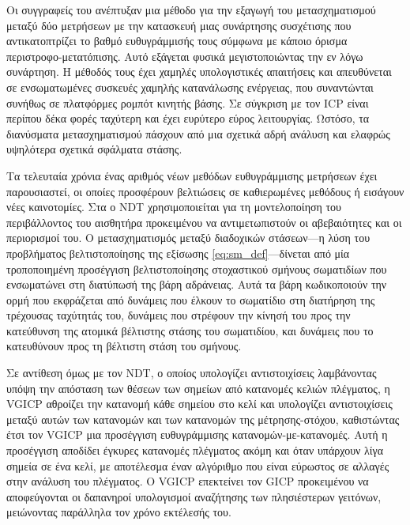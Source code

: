 Οι συγγραφείς του \cite{Konecny2016} ανέπτυξαν μια μέθοδο για την εξαγωγή του
μετασχηματισμού μεταξύ δύο μετρήσεων με την κατασκευή μιας συνάρτησης
συσχέτισης που αντικατοπτρίζει το βαθμό ευθυγράμμισής τους σύμφωνα με κάποιο
όρισμα περιστροφο-μετατόπισης. Αυτό εξάγεται φυσικά μεγιστοποιώντας την εν λόγω
συνάρτηση. Η μέθοδός τους έχει χαμηλές υπολογιστικές απαιτήσεις και απευθύνεται
σε ενσωματωμένες συσκευές χαμηλής κατανάλωσης ενέργειας, που συναντώνται συνήθως
σε πλατφόρμες ρομπότ κινητής βάσης.  Σε σύγκριση με τον ICP είναι περίπου δέκα
φορές ταχύτερη και έχει ευρύτερο εύρος λειτουργίας. Ωστόσο, τα διανύσματα
μετασχηματισμού πάσχουν από μια σχετικά αδρή ανάλυση και ελαφρώς υψηλότερα
σχετικά σφάλματα στάσης.

Τα τελευταία χρόνια ένας αριθμός νέων μεθόδων ευθυγράμμισης μετρήσεων έχει
παρουσιαστεί, οι οποίες προσφέρουν βελτιώσεις σε καθιερωμένες μεθόδους ή
εισάγουν νέες καινοτομίες.  Στα  \cite{Bouraine2020a,Bouraine2021} ο NDT
χρησιμοποιείται για τη μοντελοποίηση του περιβάλλοντος του αισθητήρα
προκειμένου να αντιμετωπιστούν οι αβεβαιότητες και οι περιορισμοί του. Ο
μετασχηματισμός μεταξύ διαδοχικών στάσεων---η λύση του προβλήματος
βελτιστοποίησης της εξίσωσης \ref{eq:sm_def}---δίνεται από μία τροποποιημένη
προσέγγιση βελτιστοποίησης στοχαστικού σμήνους σωματιδίων που ενσωματώνει στη
διατύπωσή της βάρη αδράνειας. Αυτά τα βάρη κωδικοποιούν την ορμή που εκφράζεται
από δυνάμεις που έλκουν το σωματίδιο στη διατήρηση της τρέχουσας ταχύτητάς του,
δυνάμεις που στρέφουν την κίνησή του προς την κατεύθυνση της ατομικά βέλτιστης
στάσης του σωματιδίου, και δυνάμεις που το κατευθύνουν προς τη βέλτιστη στάση
του σμήνους.

Σε αντίθεση όμως με τον NDT, ο οποίος υπολογίζει αντιστοιχίσεις λαμβάνοντας
υπόψη την απόσταση των θέσεων των σημείων από κατανομές κελιών πλέγματος, η
VGICP \cite{Koide2021a} αθροίζει την κατανομή κάθε σημείου στο κελί και
υπολογίζει αντιστοιχίσεις μεταξύ αυτών των κατανομών και των κατανομών της
μέτρησης-στόχου, καθιστώντας έτσι τον VGICP μια προσέγγιση ευθυγράμμισης
κατανομών-με-κατανομές. Αυτή η προσέγγιση αποδίδει έγκυρες κατανομές πλέγματος
ακόμη και όταν υπάρχουν λίγα σημεία σε ένα κελί, με αποτέλεσμα έναν αλγόριθμο
που είναι εύρωστος σε αλλαγές στην ανάλυση του πλέγματος. Ο VGICP επεκτείνει
τον GICP \cite{Segal2009a} προκειμένου να αποφεύγονται οι δαπανηροί υπολογισμοί
αναζήτησης των πλησιέστερων γειτόνων, μειώνοντας παράλληλα τον χρόνο εκτέλεσής
του.

